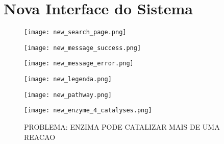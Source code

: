  
 

\section{Nova Interface do Sistema}

\begin{figure}[!h]
    \centering
    \texttt{[image: new\_search\_page.png]}
    \caption{}
    \label{fig:new_search_page}
\end{figure}

\begin{figure}[!h]
    \centering
    \texttt{[image: new\_message\_success.png]}
    \caption{}
    \label{fig:new_message_success}
\end{figure}

\begin{figure}[!h]
    \centering
    \texttt{[image: new\_message\_error.png]}
    \caption{}
    \label{fig:new_message_error}
\end{figure}

\begin{figure}[!h]
    \centering
    \texttt{[image: new\_legenda.png]}
    \caption{}
    \label{fig:new_legenda}
\end{figure}

\begin{figure}[!h]
    \centering
    \texttt{[image: new\_pathway.png]}
    \caption{}
    \label{fig:new_pathway}
\end{figure}

\begin{figure}[!h]
    \centering
    \texttt{[image: new\_enzyme\_4\_catalyses.png]}
    \caption{PROBLEMA: ENZIMA PODE CATALIZAR MAIS DE UMA REACAO}
    \label{fig:new_enzyme_4_catalyses}
\end{figure}


